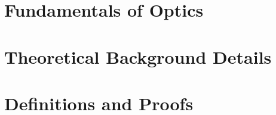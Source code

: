 \documentclass[mestrado, pos-defesa]{packages/icmc}
\begin{document}
\postextual



\begin{apendicesenv}
    \chapter{Fundamentals of Optics}
    \label{chapter:fundamentals-of-optics}
    

    \chapter{Theoretical Background Details}
    \label{chapter:theoretical-background-details}
    

    \chapter{Definitions and Proofs}
    \label{chapter:definitions-and-proofs}
    
\end{apendicesenv}
\end{document}

